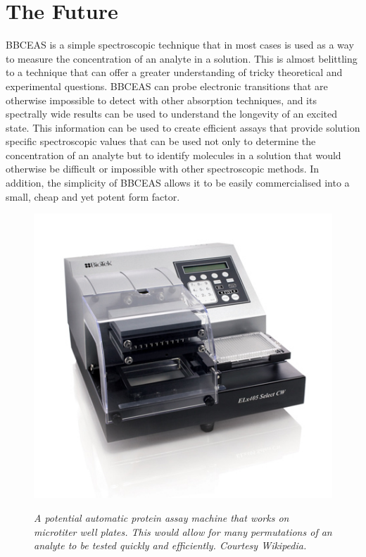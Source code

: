 \chapter{The Future} \label{ch:discussion}

\acl{BBCEAS} is a simple spectroscopic technique that in most cases is used as
a way to measure the concentration of an analyte in a solution. This is almost
belittling to a technique that can offer a greater understanding of tricky
theoretical and experimental questions. \ac{BBCEAS} can probe electronic
transitions that are otherwise impossible to detect with other absorption
techniques, and its spectrally wide results can be used to understand the
longevity of an excited state. This information can be used to create
efficient assays that provide solution specific spectroscopic values that can
be used not only to determine the concentration of an analyte but to identify
molecules in a solution that would otherwise be difficult or impossible with
other spectroscopic methods. In addition, the simplicity of \ac{BBCEAS} allows
it to be easily commercialised into a small, cheap and yet potent form factor.

\begin{figure}
\begin{center}
\includegraphics[width=\marginspace]{figures/microtiter_machine.jpeg}
\end{center}
\emph{\footnotesize{ A potential automatic protein assay machine that works on microtiter well plates. This would allow for many permutations of an analyte to be tested quickly and efficiently. Courtesy Wikipedia.}}
\label{fig:microtiter}
\end{figure}

